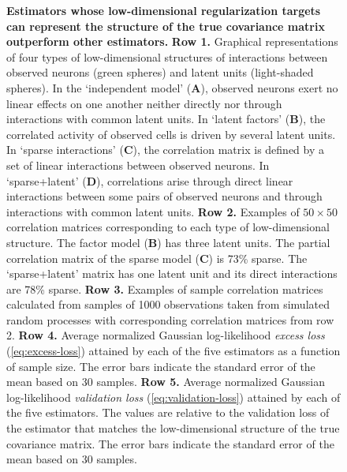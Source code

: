 \documentclass[10pt]{article}
\begin{document}
\begin{figure}[!ht]
    \begin{center}
    \end{center}
    \caption{{\bf Estimators whose low-dimensional regularization targets can represent the structure of the true covariance matrix outperform other estimators.}
        {\bf Row 1.} Graphical representations of four types of low-dimensional structures of interactions between observed neurons (green spheres) and latent units (light-shaded spheres).
        In the `independent model' ({\bf A}), observed neurons exert no linear effects on one another neither directly nor through interactions with common latent units. 
        In `latent factors' ({\bf B}), the correlated activity of observed cells is driven by several latent units. 
        In `sparse interactions' ({\bf C}), the correlation matrix is defined by a set of linear interactions between observed neurons. 
        In `sparse+latent' ({\bf D}), correlations arise through direct linear interactions between some pairs of observed neurons and through interactions with common latent units. 
        {\bf Row 2.} Examples of $50\times 50$ correlation matrices corresponding to each type of low-dimensional structure. 
        The factor model ({\bf B}) has three latent units. 
        The partial correlation matrix of the sparse model ({\bf C}) is 73\% sparse.
        The `sparse+latent' matrix has one latent unit and its direct interactions are 78\% sparse.
        {\bf Row 3.} Examples of sample correlation matrices calculated from samples of 1000 observations taken from simulated random processes with corresponding correlation matrices from row 2.
        {\bf Row 4.} Average normalized Gaussian log-likelihood \emph{excess loss} (\ref{eq:excess-loss}) attained by each of the five estimators as a function of sample size. The error bars indicate the standard error of the mean based on 30 samples.
        {\bf Row 5.} Average normalized Gaussian log-likelihood \emph{validation loss} (\ref{eq:validation-loss}) attained by each of the five estimators. The values are relative to the validation loss of the estimator that matches the low-dimensional structure of the true covariance matrix. The error bars indicate the standard error of the mean based on 30 samples.
    }
    \label{fig:02}
\end{figure} 
\end{document}
